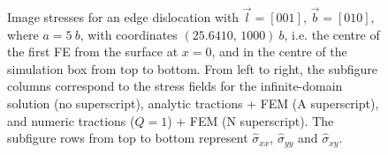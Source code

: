 \documentclass[11pt]{iopart}
\begin{document}
\begin{figure}
    \centering
    ~
    ~

    ~
    ~

    ~
    ~
    \caption{Image stresses for an edge dislocation with $\vec{l} = [0 0 1]$, $\vec{b} = [0 1 0]$, where $a = 5~b$, with coordinates $(25.6410,\, 1000)~b$, i.e. the centre of the first FE from the surface at $x=0$, and in the centre of the simulation box from top to bottom. From left to right, the subfigure columns correspond to the stress fields for the infinite-domain solution (no superscript), analytic tractions + FEM (A superscript), and numeric tractions ($Q = 1$) + FEM (N superscript). The subfigure rows from top to bottom represent $\hat{\sigma}_{xx}$, $\hat{\sigma}_{yy}$ and $\hat{\sigma}_{xy}$.}
    \label{f:head_vs_ana_vs_num_epar}
\end{figure}
\end{document}
